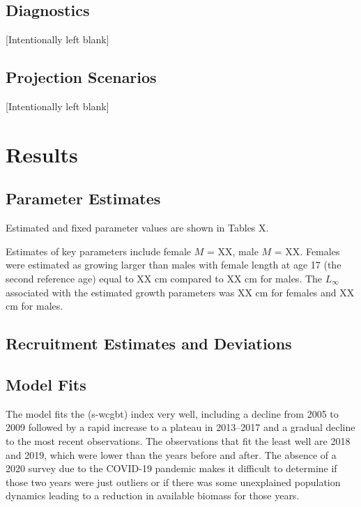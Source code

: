 \documentclass[
]{scrartcl}
\begin{document}
\subsection{Diagnostics}\label{sec-diagnostics}

{[}Intentionally left blank{]}

\subsection{Projection Scenarios}\label{projection-scenarios}

{[}Intentionally left blank{]}

\newpage{}

\section{Results}\label{results}

\subsection{Parameter Estimates}\label{parameter-estimates}

Estimated and fixed parameter values are shown in Tables X.

Estimates of key parameters include female \(M\) = XX, male \(M\) = XX.
Females were estimated as growing larger than males with female length
at age 17 (the second reference age) equal to XX cm compared to XX cm
for males. The \(L_\infty\) associated with the estimated growth
parameters was XX cm for females and XX cm for males.

\subsection{Recruitment Estimates and
Deviations}\label{recruitment-estimates-and-deviations}

\subsection{Model Fits}\label{model-fits}

The model fits the (s-wcgbt) index very well, including a decline from
2005 to 2009 followed by a rapid increase to a plateau in 2013--2017 and
a gradual decline to the most recent observations. The observations that
fit the least well are 2018 and 2019, which were lower than the years
before and after. The absence of a 2020 survey due to the COVID-19
pandemic makes it difficult to determine if those two years were just
outliers or if there was some unexplained population dynamics leading to
a reduction in available biomass for those years.
\end{document}
